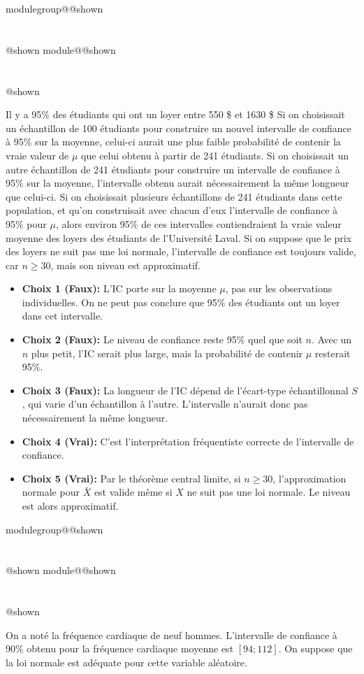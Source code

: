 \documentclass{Evaluation}
\makeatletter
\newcommand{\currentmodulekey}{}
\newcommand{\currentmoduletitle}{}
\newcommand{\currentgroupkey}{}
\newcommand{\currentgrouptitle}{}
\newcommand{\showmoduleifneeded}{%
  \ifx\currentgroupkey\empty\else
    \expandafter\ifx\csname modulegroup@\currentgroupkey @shown\endcsname\relax
      \section*{\currentgrouptitle}%
      \expandafter\gdef\csname modulegroup@\currentgroupkey @shown\endcsname{1}%
    \fi
  \fi
  \expandafter\ifx\csname module@\currentmodulekey @shown\endcsname\relax
    \section*{\currentmoduletitle}%
    \expandafter\gdef\csname module@\currentmodulekey @shown\endcsname{1}%
  \fi
}
\newenvironment{H24}{\showmoduleifneeded}{}
\newenvironment{A24}{\showmoduleifneeded}{}
\makeatother
\begin{document}
\begin{questions}
\begin{H24}
\begin{checkboxes}
\choice Il y a 95\% des étudiants qui ont un loyer entre 550 \$ et 1630 \$
\choice Si on choisissait un échantillon de 100 étudiants pour construire un nouvel intervalle de confiance à 95\% sur la moyenne, celui-ci aurait une plus faible probabilité de contenir la vraie valeur de $\mu$ que celui obtenu à partir de 241 étudiants.
\choice Si on choisissait un autre échantillon de 241 étudiants pour construire un intervalle de confiance à 95\% sur la moyenne, l'intervalle obtenu aurait nécessairement la même longueur que celui-ci.
\correctchoice Si on choisissait plusieurs échantillons de 241 étudiants dans cette population, et qu'on construisait avec chacun d'eux l'intervalle de confiance à 95\% pour $\mu$, alors environ 95\% de ces intervalles contiendraient la vraie valeur moyenne des loyers des étudiants de l'Université Laval.
\correctchoice Si on suppose que le prix des loyers ne suit pas une loi normale, l'intervalle de confiance est toujours valide, car $n\geq 30$, mais son niveau est approximatif.
\end{checkboxes}
\begin{solution}
\begin{itemize}
    \item \textbf{Choix 1 (Faux):} L'IC porte sur la moyenne $\mu$, pas sur les observations individuelles. On ne peut pas conclure que 95\% des étudiants ont un loyer dans cet intervalle.
    \item \textbf{Choix 2 (Faux):} Le niveau de confiance reste 95\% quel que soit $n$. Avec un $n$ plus petit, l'IC serait plus large, mais la probabilité de contenir $\mu$ resterait 95\%.
    \item \textbf{Choix 3 (Faux):} La longueur de l'IC dépend de l'écart-type échantillonnal $S$, qui varie d'un échantillon à l'autre. L'intervalle n'aurait donc pas nécessairement la même longueur.
    \item \textbf{Choix 4 (Vrai):} C'est l'interprétation fréquentiste correcte de l'intervalle de confiance.
    \item \textbf{Choix 5 (Vrai):} Par le théorème central limite, si $n \geq 30$, l'approximation normale pour $\bar{X}$ est valide même si $X$ ne suit pas une loi normale. Le niveau est alors approximatif.
\end{itemize}
\end{solution}
\end{H24}

\begin{A24}
\question {} %
On a noté la fréquence cardiaque de neuf hommes.
L'intervalle de confiance à 90\% obtenu pour la fréquence cardiaque moyenne est $[94; 112]$.
On suppose que la loi normale est adéquate pour cette variable aléatoire.


\end{A24}
\end{questions}
\end{document}
